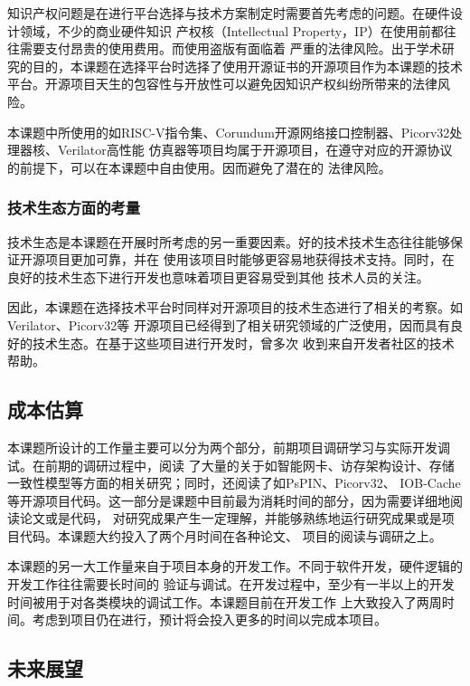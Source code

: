 知识产权问题是在进行平台选择与技术方案制定时需要首先考虑的问题。在硬件设计领域，不少的商业硬件知识
产权核（Intellectual Property，IP）在使用前都往往需要支付昂贵的使用费用。而使用盗版有面临着
严重的法律风险。出于学术研究的目的，本课题在选择平台时选择了使用开源证书的开源项目作为本课题的技术
平台。开源项目天生的包容性与开放性可以避免因知识产权纠纷所带来的法律风险。

本课题中所使用的如RISC-V指令集、Corundum开源网络接口控制器、Picorv32处理器核、Verilator高性能
仿真器等项目均属于开源项目，在遵守对应的开源协议的前提下，可以在本课题中自由使用。因而避免了潜在的
法律风险。

\subsubsection{技术生态方面的考量}

技术生态是本课题在开展时所考虑的另一重要因素。好的技术技术生态往往能够保证开源项目更加可靠，并在
使用该项目时能够更容易地获得技术支持。同时，在良好的技术生态下进行开发也意味着项目更容易受到其他
技术人员的关注。

因此，本课题在选择技术平台时同样对开源项目的技术生态进行了相关的考察。如Verilator、Picorv32等
开源项目已经得到了相关研究领域的广泛使用，因而具有良好的技术生态。在基于这些项目进行开发时，曾多次
收到来自开发者社区的技术帮助。

\subsection{成本估算}


本课题所设计的工作量主要可以分为两个部分，前期项目调研学习与实际开发调试。在前期的调研过程中，阅读
了大量的关于如智能网卡、访存架构设计、存储一致性模型等方面的相关研究；同时，还阅读了如PsPIN、Picorv32、
IOB-Cache等开源项目代码。这一部分是课题中目前最为消耗时间的部分，因为需要详细地阅读论文或是代码，
对研究成果产生一定理解，并能够熟练地运行研究成果或是项目代码。本课题大约投入了两个月时间在各种论文、
项目的阅读与调研之上。

本课题的另一大工作量来自于项目本身的开发工作。不同于软件开发，硬件逻辑的开发工作往往需要长时间的
验证与调试。在开发过程中，至少有一半以上的开发时间被用于对各类模块的调试工作。本课题目前在开发工作
上大致投入了两周时间。考虑到项目仍在进行，预计将会投入更多的时间以完成本项目。

\subsection{未来展望}

